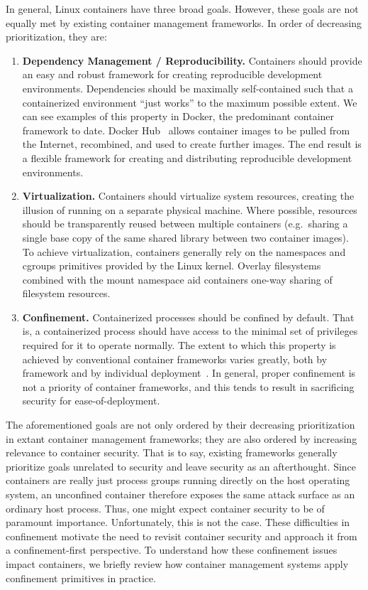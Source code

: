 In general, Linux containers have three broad goals. However, these goals are not
equally met by existing container management frameworks. In order of decreasing
prioritization, they are:
\begin{enumerate}
  \item \textbf{Dependency Management / Reproducibility.}
    Containers should provide an easy and robust framework for creating reproducible
    development environments. Dependencies should be maximally self-contained such that
    a containerized environment \enquote{just works} to the maximum possible extent. We
    can see examples of this property in Docker, the predominant container framework to
    date. Docker Hub~\cite{docker_hub} allows container images to be pulled from the
    Internet, recombined, and used to create further images. The end result is a flexible
    framework for creating and distributing reproducible development environments.

  \item \textbf{Virtualization.}
    Containers should virtualize system resources, creating the illusion of running on
    a separate physical machine. Where possible, resources should be transparently reused
    between multiple containers (e.g.~sharing a single base copy of the same shared
    library between two container images). To achieve virtualization, containers generally
    rely on the namespaces and cgroups primitives provided by the Linux kernel. Overlay
    filesystems~\cite{overlayfs} combined with the mount namespace aid containers one-way
    sharing of filesystem resources.

  \item \textbf{Confinement.}
    Containerized processes should be confined by default. That is, a containerized
    process should have access to the minimal set of privileges required for it to operate
    normally. The extent to which this property is achieved by conventional container
    frameworks varies greatly, both by framework and by individual
    deployment~\cite{sultan2019_container_security, lin2018_container_security,
    bui2015_docker_analysis}. In general, proper confinement is not a priority of
    container frameworks, and this tends to result in sacrificing security for
    ease-of-deployment.
\end{enumerate}

The aforementioned goals are not only ordered by their decreasing prioritization in extant
container management frameworks; they are also ordered by increasing relevance to
container security. That is to say, existing frameworks generally prioritize goals
unrelated to security and leave security as an afterthought. Since containers are really
just process groups running directly on the host operating system, an unconfined container
therefore exposes the same attack surface as an ordinary host process. Thus, one might
expect container security to be of paramount importance. Unfortunately, this is not the
case. These difficulties in confinement motivate the need to revisit container security
and approach it from a confinement-first perspective. To understand how these confinement
issues impact containers, we briefly review how container management systems apply
confinement primitives in practice.

